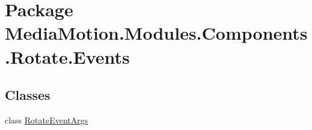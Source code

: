 \hypertarget{namespace_media_motion_1_1_modules_1_1_components_1_1_rotate_1_1_events}{\section{Package Media\+Motion.\+Modules.\+Components.\+Rotate.\+Events}
\label{namespace_media_motion_1_1_modules_1_1_components_1_1_rotate_1_1_events}
}
\subsection*{Classes}
\begin{DoxyCompactItemize}
\item 
class \hyperlink{class_media_motion_1_1_modules_1_1_components_1_1_rotate_1_1_events_1_1_rotate_event_args}{Rotate\+Event\+Args}
\end{DoxyCompactItemize}
